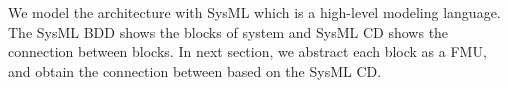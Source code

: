 \begin{figure}[htbp]
\end{figure}
We model the architecture with SysML which is a high-level modeling language. The SysML BDD shows the blocks of system and SysML CD shows the connection between blocks. In next section, we abstract each block as a FMU, and obtain the connection between based on the SysML CD.

